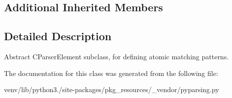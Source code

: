 \subsection*{Additional Inherited Members}


\subsection{Detailed Description}
\begin{DoxyVerb}Abstract C{ParserElement} subclass, for defining atomic matching patterns.
\end{DoxyVerb}
 

The documentation for this class was generated from the following file\+:\begin{DoxyCompactItemize}
\item 
venv/lib/python3./site-\/packages/pkg\+\_\+resources/\+\_\+vendor/pyparsing.\+py\end{DoxyCompactItemize}
